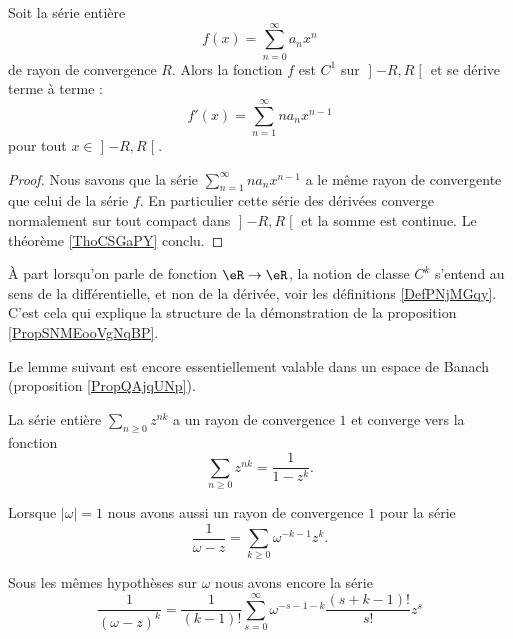 \begin{proposition}     \label{ProptzOIuG}
    Soit la série entière
    \begin{equation}
        f(x)=\sum_{n=0}^{\infty}a_n x^n
    \end{equation}
    de rayon de convergence \( R\). Alors la fonction \( f\) est \( C^1\) sur \( \mathopen] -R , R \mathclose[\) et se dérive terme à terme :
    \begin{equation}
        f'(x)=\sum_{n=1}^{\infty}na_nx^{n-1}
    \end{equation}
    pour tout \( x\in\mathopen] -R , R \mathclose[\).
\end{proposition}

\begin{proof}
    Nous savons que la série \( \sum_{n=1}^{\infty}na_nx^{n-1}\) a le même rayon de convergente que celui de la série \( f\). En particulier cette série des dérivées converge normalement sur tout compact dans \( \mathopen] -R , R \mathclose[\) et la somme est continue. Le théorème \ref{ThoCSGaPY} conclu.
\end{proof}

\begin{remark}
    À part lorsqu'on parle de fonction \( \eR\to \eR\), la notion de classe \( C^k\) s'entend au sens de la différentielle, et non de la dérivée, voir les définitions \ref{DefPNjMGqy}. C'est cela qui explique la structure de la démonstration de la proposition \ref{PropSNMEooVgNqBP}.
\end{remark}

Le lemme suivant est encore essentiellement valable dans un espace de Banach (proposition \ref{PropQAjqUNp}).
\begin{lemma}       \label{LemPQFDooGUPBvF}
    La série entière \( \sum_{n\geq 0}z^{nk}\) a un rayon de convergence \( 1\) et converge vers la fonction
    \begin{equation}
        \sum_{n\geq 0}z^{nk}=\frac{1}{ 1-z^k }.
    \end{equation}

    Lorsque \( | \omega |=1\) nous avons aussi un rayon de convergence \( 1\) pour la série
    \begin{equation}        \label{EqSSHZooLwCBAZ}
        \frac{1}{ \omega-z }=\sum_{k\geq 0}\omega^{-k-1}z^k.
    \end{equation}

    Sous les mêmes hypothèses sur \( \omega\) nous avons encore la série
    \begin{equation}
        \frac{1}{ (\omega-z)^k }=\frac{1}{ (k-1)! }\sum_{s=0}^{\infty}\omega^{-s-1-k}\frac{ (s+k-1)! }{ s! }z^s
    \end{equation}
    
\end{lemma}

